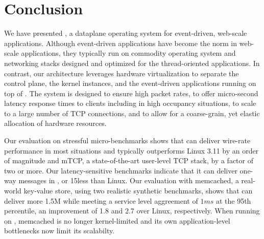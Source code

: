 
\section{Conclusion}

We have presented \ix, a dataplane operating system for event-driven,
web-scale applications.  Although event-driven applications have
become the norm in web-scale applications, they typically run on
commodity operating system and networking stacks designed and
optimized for the thread-oriented applications.  In contrast, our
architecture leverages hardware virtualization to separate the control
plane, the \ix kernel instances, and the event-driven applications
running on top of \ix.  The system is designed to ensure high packet
rates, to offer micro-second latency response times to clients
including in high occupancy situations, to scale to a large number of 
TCP connections, and to allow for a coarse-grain, yet
elastic allocation of hardware resources.

Our evaluation on stressful micro-benchmarks shows that \ix can
deliver wire-rate performance in most situations and typically
outperforms Linux 3.11 by an order of magnitude and mTCP, a
state-of-the-art user-level TCP stack, by a factor of two or more. Our
latency-sensitive benchmarks indicate that it can deliver one-way
messages in \microsecond, or 15\microsecond less than Linux.
Our evaluation with memcached, a real-world key-value store,
using two realistic synthetic benchmarks, shows that \ix can deliver
more \twiddle  1.5M while meeting a service level aggreement of $1ms$ at the
95th percentile, an improvement of 1.8 and 2.7 over Linux, respectively.
When running on \ix, memcached is no longer
kernel-limited and its own application-level bottlenecks now limit its
scalabilty.



